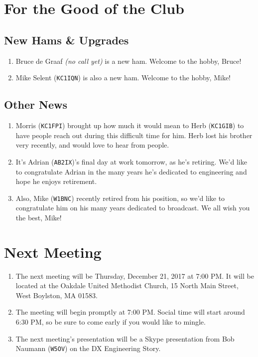 \documentclass[10pt,letterpaper]{article}
\begin{document}
\section{For the Good of the Club}

\subsection{New Hams \& Upgrades}
\begin{enumerate}
  \item Bruce de Graaf \emph{(no call yet)} is a new ham. Welcome to the hobby, Bruce!
  \item Mike Selent (\texttt{KC1IQN}) is also a new ham. Welcome to the hobby, Mike!
\end{enumerate}

\subsection{Other News}
\begin{enumerate}
  \item Morris (\texttt{KC1FPI}) brought up how much it would mean to Herb (\texttt{KC1GIB}) to have people reach out during this difficult time for him. Herb lost his brother very recently, and would love to hear from people.
  \item It's Adrian (\texttt{AB2IX})'s final day at work tomorrow, as he's retiring. We'd like to congratulate Adrian in the many years he's dedicated to engineering and hope he enjoys retirement.
  \item Also, Mike (\texttt{W1BNC}) recently retired from his position, so we'd like to congratulate him on his many years dedicated to broadcast. We all wish you the best, Mike!
\end{enumerate}

\section{Next Meeting}
\begin{enumerate}
  \item The next meeting will be Thursday, December 21, 2017 at 7:00 PM. It will be located at the Oakdale United Methodist Church, 15 North Main Street, West Boylston, MA 01583.
  \item The meeting will begin promptly at 7:00 PM. Social time will start around 6:30 PM, so be sure to come early if you would like to mingle.
  \item The next meeting's presentation will be a Skype presentation from Bob Naumann (\texttt{W5OV}) on the DX Engineering Story.
\end{enumerate}
\end{document}
